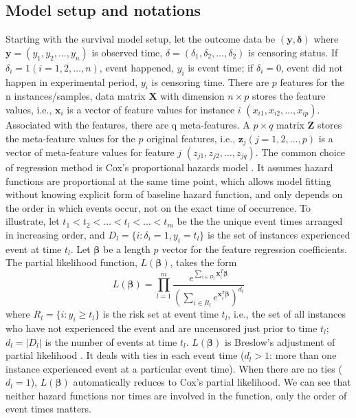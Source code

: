 \subsection{Model setup and notations}
Starting with the survival model setup, let the outcome data be $(\bm{y, \delta})$ where $\bm{y}=(y_1,y_2,\dots,y_n)$ is observed time, $\delta=(\delta_1,\delta_2,\dots,\delta_2)$ is censoring status. If $\delta_i = 1 (i=1,2,\dots,n)$, event happened, $y_i$ is event time; if $\delta_i=0$, event did not happen in experimental period, $y_i$ is censoring time. There are $p$ features for the n instances/samples, data matrix $\bm{X}$ with dimension $n\times p$ stores the feature values, i.e., $\bm{x}_i$ is a vector of feature values for instance $i$ $(x_{i1},x_{i2},\dots,x_{ip})$. Associated with the features, there are q meta-features. A $p\times q$ matrix $\bm{Z}$ stores the meta-feature values for the $p$ original features, i.e., $\bm{z}_j (j=1,2,\dots,p)$ is a vector of meta-feature values for feature $j$ $(z_{j1},z_{j2},\dots,z_{jq})$. The common choice of regression method is Cox's proportional hazards model \citep{cox1972regression}. It assumes hazard functions are proportional at the same time point, which allows model fitting without knowing explicit form of baseline hazard function, and only depends on the order in which events occur, not on the exact time of occurrence. To illustrate, let $t_1<t_2<\dots<t_l<\dots<t_m$ be the the unique event times arranged in increasing order, and $D_l=\{i:\delta_i=1,y_i=t_l\}$ is the set of instances experienced event at time $t_l$. Let $\bm{\beta}$ be a length $p$ vector for the feature regression coefficients. The partial likelihood function, $L(\bm{\beta})$, takes the form 
\begin{displaymath}
L(\bm{\beta}) = \prod_{l=1}^{m} \frac{e^{\sum_{i\in D_l}\bm{x}_i^T\bm{\beta}}}{(\sum_{i\in R_l} e^{\bm{x}_i^T\bm{\beta}})^{d_l}}
\end{displaymath}
where $R_l=\{i: y_i\geq t_l\}$ is the risk set at event time $t_l$, i.e., the set of all instances who have not experienced the event and are uncensored just prior to time $t_l$; $d_l=|D_l|$ is the number of events at time $t_l$. $L(\bm{\beta})$ is Breslow's adjustment of partial likelihood \citep{breslow1972contribution}. It deals with ties in each event time ($d_l>1$: more than one instance experienced event at a particular event time). When there are no ties ($d_l=1$), $L(\bm{\beta})$ automatically reduces to Cox's partial likelihood. We can see that neither hazard functions nor times are involved in the function, only the order of event times matters. 

